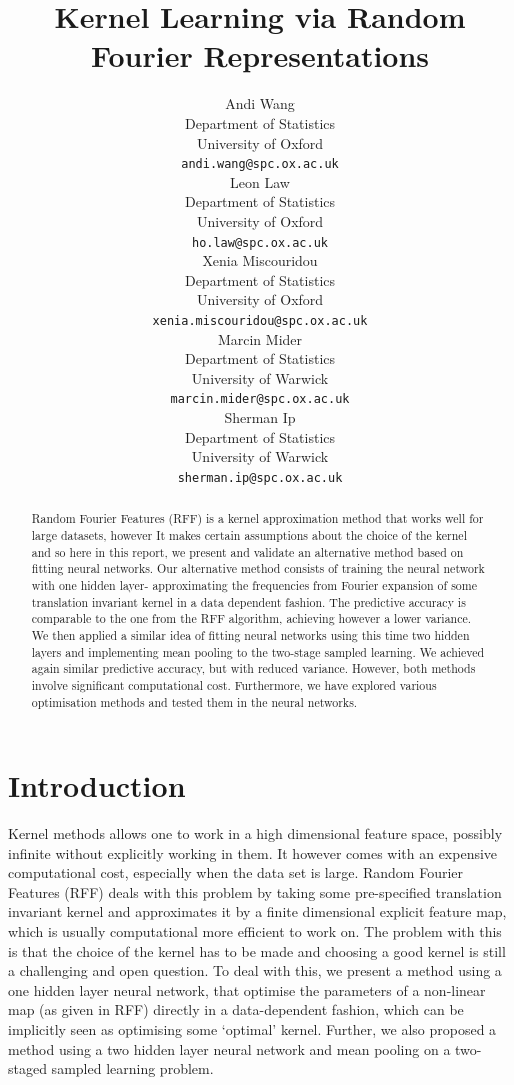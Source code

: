 \documentclass{article} %
\title{Kernel Learning via Random Fourier Representations}
\author{
Andi Wang\\
Department of Statistics\\
University of Oxford\\
\texttt{andi.wang@spc.ox.ac.uk} \\
\And
Leon Law \\
Department of Statistics \\
University of Oxford \\
\texttt{ho.law@spc.ox.ac.uk} \\
\AND
Xenia Miscouridou \\
Department of Statistics \\
University of Oxford \\
\texttt{xenia.miscouridou@spc.ox.ac.uk} \\
\And
Marcin Mider \\
Department of Statistics \\
University of Warwick\\
\texttt{marcin.mider@spc.ox.ac.uk} \\
\And
Sherman Ip \\
Department of Statistics \\
University of Warwick \\
\texttt{sherman.ip@spc.ox.ac.uk} \\
}
\begin{document}
\maketitle

\begin{abstract}
Random Fourier Features (RFF) is a kernel approximation method that works well for large datasets, however It makes certain assumptions about the choice of the kernel and so here in this report, we present and validate an alternative method based on fitting neural networks. Our alternative method consists of training the neural network with one hidden layer- approximating the frequencies from Fourier expansion of some translation invariant kernel in a data dependent fashion. The predictive accuracy is comparable to the one from the RFF algorithm, achieving however a lower variance. We then applied a similar idea of fitting neural networks using this time two hidden layers and implementing mean pooling to the two-stage sampled learning. We achieved again similar predictive accuracy, but with reduced variance. However,  both methods involve significant computational cost. Furthermore, we have explored various optimisation methods and tested them in the neural networks.
\end{abstract}



\section{Introduction}
Kernel methods allows one to work in a high dimensional feature space, possibly infinite without explicitly working in them. It however comes with an expensive computational cost, especially when the data set is large. Random Fourier Features (RFF) \cite{Rahimi} deals with this problem by taking some pre-specified translation invariant kernel and approximates it by a finite dimensional explicit feature map, which is usually computational more efficient to work on. The problem with this is that the choice of the kernel has to be made and choosing a good kernel is still a challenging and open question. To deal with this, we present a method using a one hidden layer neural network, that optimise the parameters of a non-linear map (as given in RFF) directly in a data-dependent fashion, which can be implicitly seen as optimising some `optimal' kernel. Further, we also proposed a method using a two hidden layer neural network and mean pooling on a two-staged sampled learning problem.
\\
\end{document}
